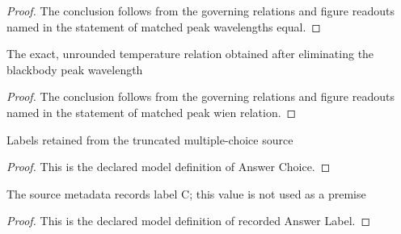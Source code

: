 \begin{proof}
  The conclusion follows from the governing relations and figure readouts named in the statement of matched peak wavelengths equal.
\end{proof}
\begin{lemma}
  \label{lem:physics:phyx-mini-0646:phyxminiproblems-problemphyxmini0646-matched-peak-wien-relation}
  The exact, unrounded temperature relation obtained after eliminating the blackbody peak wavelength
\end{lemma}
\begin{proof}
  The conclusion follows from the governing relations and figure readouts named in the statement of matched peak wien relation.
\end{proof}
\begin{definition}
  \label{def:physics:phyx-mini-0646:phyxminiproblems-problemphyxmini0646-answerchoice}
  Labels retained from the truncated multiple-choice source
\end{definition}
\begin{proof}
  This is the declared model definition of Answer Choice.
\end{proof}
\begin{definition}
  \label{def:physics:phyx-mini-0646:phyxminiproblems-problemphyxmini0646-recordedanswerlabel}
  The source metadata records label C; this value is not used as a premise
\end{definition}
\begin{proof}
  This is the declared model definition of recorded Answer Label.
\end{proof}
